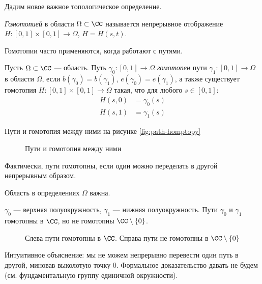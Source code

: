 Дадим новое важное топологическое определение.
\begin{df}[гомотопия]
 \textit{Гомотопией} в области $\Omega \subset \CC$ называется непрерывное отображение $H \colon [0,1] \times [0,1] \to \Omega$, $H = H(s,t)$. 
\end{df}

Гомотопии часто применяются, когда работают с путями.

\begin{df}
 Пусть $\Omega \subset \CC$ --- область. Путь $\gamma_0 \colon [0,1] \to \Omega$ \textit{гомотопен} пути $\gamma_1 \colon [0,1] \to \Omega$ в области $\Omega$, если $b(\gamma_0) = b(\gamma_1)$, $e(\gamma_0) = e(\gamma_1)$, а также существует гомотопия $H \colon [0,1] \times [0,1] \to \Omega$  такая, что для любого $s \in [0,1]$:
 \begin{align*}
  H(s, 0) &= \gamma_0(s) \\
  H(s,1) &= \gamma_1(s)
 \end{align*} 
\end{df}
\begin{exmpl}
	Пути и гомотопия между ними на рисунке \eqref{fig:path-homptopy}	
\end{exmpl}

\begin{figure}[ht]
    \centering
    \caption{Пути и гомотопия между ними}
    \label{fig:path-homptopy}
\end{figure}

Фактически, пути гомотопны, если один можно переделать в другой непрерывным образом.

Область в определениях $\Omega$ важна.

\begin{exmpl}
 $\gamma_0$ --- верхняя полуокружность, $\gamma_1$ ---  нижняя полуокружность. Пути $\gamma_0$ и $\gamma_1$ гомотопны в $\CC$, но не гомотопны $\CC \setminus \left\{ 0 \right\}$.

\begin{figure}[ht]
    \centering
		\caption{Слева пути гомотопны в $\CC$. Справа пути не гомотопны в $\CC \setminus \{0\}$}
    \label{fig:paths-without-homptopy}
\end{figure}

 Интуитивное объяснение: мы не можем непрерывно перевести один путь в другой, миновав выколотую точку $0$. Формальное доказательство давать не будем (см. фундаментальную группу единичной окружности).
\end{exmpl}

